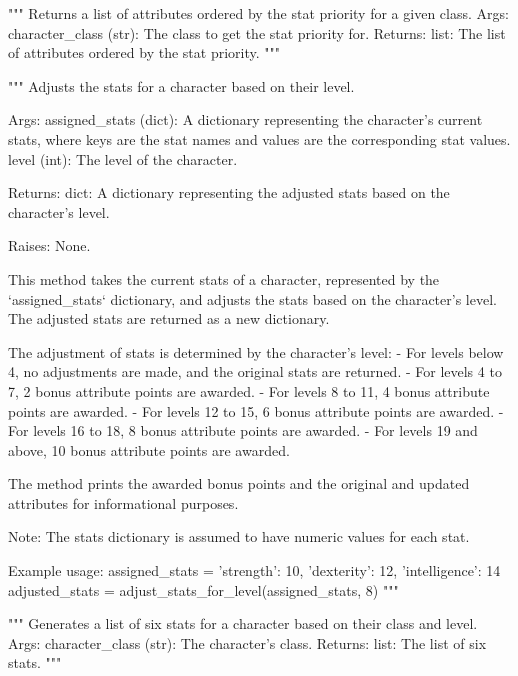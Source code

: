 \begin{codebox}
"""
Returns a list of attributes ordered by the stat priority for a given class.
Args:
    character_class (str): The class to get the stat priority for.
Returns:
    list: The list of attributes ordered by the stat priority.
"""
\end{codebox}

\begin{codebox}
"""
Adjusts the stats for a character based on their level.

Args:
    assigned_stats (dict): A dictionary representing the character's current stats, where keys are
        the stat names and values are the corresponding stat values.
    level (int): The level of the character.

Returns:
    dict: A dictionary representing the adjusted stats based on the character's level.

Raises:
    None.

This method takes the current stats of a character, represented by the `assigned_stats` dictionary,
and adjusts the stats based on the character's level. The adjusted stats are returned as a new dictionary.

The adjustment of stats is determined by the character's level:
 - For levels below 4, no adjustments are made, and the original stats are returned.
 - For levels 4 to 7, 2 bonus attribute points are awarded.
 - For levels 8 to 11, 4 bonus attribute points are awarded.
 - For levels 12 to 15, 6 bonus attribute points are awarded.
 - For levels 16 to 18, 8 bonus attribute points are awarded.
 - For levels 19 and above, 10 bonus attribute points are awarded.

The method prints the awarded bonus points and the original and updated attributes for informational purposes.

Note: The stats dictionary is assumed to have numeric values for each stat.

Example usage:
    assigned_stats = {'strength': 10, 'dexterity': 12, 'intelligence': 14}
    adjusted_stats = adjust_stats_for_level(assigned_stats, 8)
"""
\end{codebox}

\begin{codebox}[generate\_character\_stats(character\_class, level=1)]
"""
Generates a list of six stats for a character based on their class and level.
Args:
    character_class (str): The character's class.
Returns:
    list: The list of six stats.
"""
\end{codebox}

